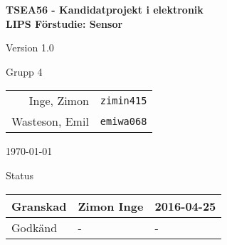 \documentclass[11pt]{article}
\begin{document}
\begin{titlepage}
\begin{center}

{\Large\bfseries TSEA56 - Kandidatprojekt i elektronik \\ LIPS Förstudie: Sensor}

\vspace{5em}

Version 1.0

\vspace{5em}
Grupp 4 \\
\begin{tabular}{rl}
Inge, Zimon&\verb+zimin415+
\\
Wasteson, Emil&\verb+emiwa068+
\\

\end{tabular}

\vspace{5em}
\today

\vspace{16em}
Status
\begin{longtable}{|l|l|l|} \hline

Granskad & Zimon Inge & 2016-04-25 \\ \hline
Godkänd & - & - \\ \hline
 
\end{longtable}


\end{center}
\end{titlepage}
\end{document}

